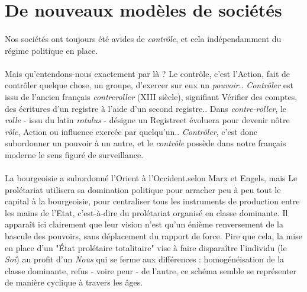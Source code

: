 \section{De nouveaux modèles de sociétés}

\paragraph{} Nos sociétés ont toujours été avides de \emph{contrôle}, et cela indépendamment du régime politique en 
place. 

\paragraph{} Mais qu'entendons-nous exactement par là ? Le contrôle, c'est l'\guillemotleft Action, fait de contrôler
quelque chose, un groupe, d'exercer sur eux un \emph{pouvoir}.\guillemotright. \cite{Controle0} \emph{Contrôler} est
issu de l'ancien français \emph{contreroller} (XIII siècle), signifiant \guillemotleft Vérifier des comptes, des
écritures d'un registre à l'aide d'un second registre.\guillemotright. \cite{Controle1} Dans \emph{contre-roller}, le 
\emph{rolle} - issu du latin \emph{rotulus} - désigne un \guillemotleft Registre\guillemotright et évoluera pour devenir
nôtre \emph{rôle}, \guillemotleft Action ou influence exercée par quelqu'un.\guillemotright. \emph{Contrôler}, c'est donc
subordonner un pouvoir à un autre, et le \emph{contrôle} possède dans notre français moderne le sens figuré de \guillemotleft
surveillance\guillemotright.

\paragraph{} \guillemotleft La bourgeoisie a subordonné l'Orient à l'Occident.\guillemotright selon Marx et Engels,
mais \guillemotleft Le prolétariat utilisera sa domination politique pour arracher peu à peu tout le capital à la
bourgeoisie, pour centraliser tous les instruments de production entre les mains de l'Etat, c'est-à-dire du prolétariat
organisé en classe dominante.\guillemotright \cite{Marx1} Il apparaît ici clairement que leur vision
n'est qu'un énième renversement de la bascule des pouvoirs, sans déplacement du rapport de force. Pire que cela, la mise
en place d'un "État prolétaire totalitaire" vise à faire disparaître l'individu (le \emph{Soi}) au profit d'un \emph{Nous}
qui se ferme aux différences : homogénéisation de la classe dominante, refus - voire peur - de l'autre, ce schéma semble
se représenter de manière cyclique à travers les âges.

